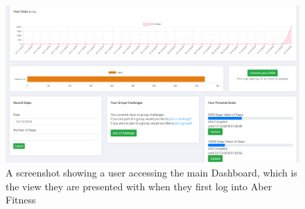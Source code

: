 \begin{figure}[H]
    \centering
    \includegraphics[width=\textwidth]{Images/service_dashboard.png}
    \caption{A screenshot showing a user accessing the main Dashboard, which is the view they are presented with when they first log into Aber Fitness}
\end{figure}